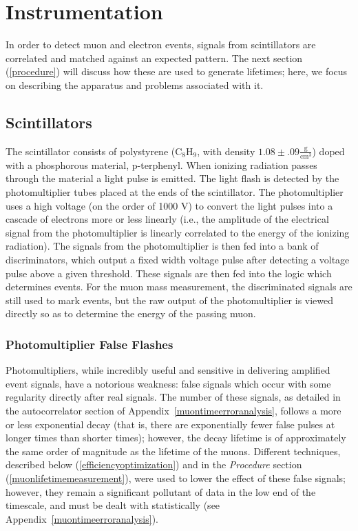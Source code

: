 \section{Instrumentation}
\label{instrumentation}

In order to detect muon and electron events, signals from scintillators are correlated and matched against an expected pattern. The next section (\ref{procedure}) will discuss how these are used to generate lifetimes; here, we focus on describing the apparatus and problems associated with it.

\subsection{Scintillators}
\label{scintillators}

The scintillator consists of polystyrene ($\mathrm{C}_{8}\mathrm{H}_{9}$, with density $1.08 \pm .09 \frac{\mathrm{g}}{\mathrm{cm}^{3}}$) doped with a phosphorous material, p-terphenyl. When ionizing radiation passes through the material a light pulse is emitted. The light flash is detected by the photomultiplier tubes placed at the ends of the scintillator. The photomultiplier uses a high voltage (on the order of 1000 V) to convert the light pulses into a cascade of electrons more or less linearly (i.e., the amplitude of the electrical signal from the photomultiplier is linearly correlated to the energy of the ionizing radiation). The signals from the photomultiplier is then fed into a bank of discriminators, which output a fixed width voltage pulse after detecting a voltage pulse above a given threshold. These signals are then fed into the logic which determines events. For the muon mass measurement, the discriminated signals are still used to mark events, but the raw output of the photomultiplier is viewed directly so as to determine the energy of the passing muon.

\subsubsection{Photomultiplier False Flashes}
\label{photomultiplierfalseflashes}

Photomultipliers, while incredibly useful and sensitive in delivering amplified event signals, have a notorious weakness: false signals which occur with some regularity directly after real signals. The number of these signals, as detailed in the autocorrelator section of Appendix~\ref{muontimeerroranalysis}, follows a more or less exponential decay (that is, there are exponentially fewer false pulses at longer times than shorter times); however, the decay lifetime is of approximately the same order of magnitude as the lifetime of the muons. Different techniques, described below (\ref{efficiencyoptimization}) and in the \emph{Procedure} section (\ref{muonlifetimemeasurement}), were used to lower the effect of these false signals; however, they remain a significant pollutant of data in the low end of the timescale, and must be dealt with statistically (see Appendix~\ref{muontimeerroranalysis}).

